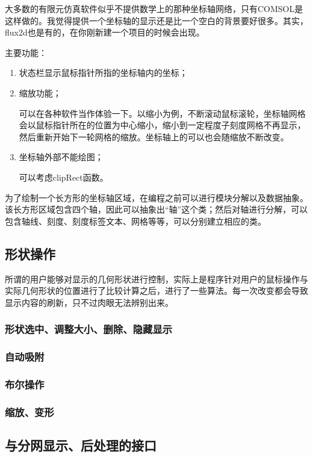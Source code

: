大多数的有限元仿真软件似乎不提供数学上的那种坐标轴网络，只有COMSOL是这样做的。我觉得提供一个坐标轴的显示还是比一个空白的背景要好很多。其实，flux2d也是有的，在你刚新建一个项目的时候会出现。

主要功能：
\begin{enumerate}
	\item 状态栏显示鼠标指针所指的坐标轴内的坐标；
	\item 缩放功能；
	
\hspace*{2em} 可以在各种软件当作体验一下。以缩小为例，不断滚动鼠标滚轮，坐标轴网格会以鼠标指针所在的位置为中心缩小，缩小到一定程度子刻度网格不再显示，然后重新开始下一轮网格的缩放。坐标轴上的可以也会随缩放不断改变。
	\item 坐标轴外部不能绘图；

\hspace*{2em} 可以考虑clipRect函数。
\end{enumerate}

为了绘制一个长方形的坐标轴区域，在编程之前可以进行模块分解以及数据抽象。该长方形区域包含四个轴，因此可以抽象出“轴”这个类；然后对轴进行分解，可以包含轴线、刻度、刻度标签文本、网格等等，可以分别建立相应的类。
\subsection{形状操作}
所谓的用户能够对显示的几何形状进行控制，实际上是程序针对用户的鼠标操作与实际几何形状的位置进行了比较计算之后，进行了一些算法。每一次改变都会导致显示内容的刷新，只不过肉眼无法辨别出来。
\subsubsection{形状选中、调整大小、删除、隐藏显示}

\subsubsection{自动吸附}

\subsubsection{布尔操作}

\subsubsection{缩放、变形}

\subsection{与分网显示、后处理的接口}

